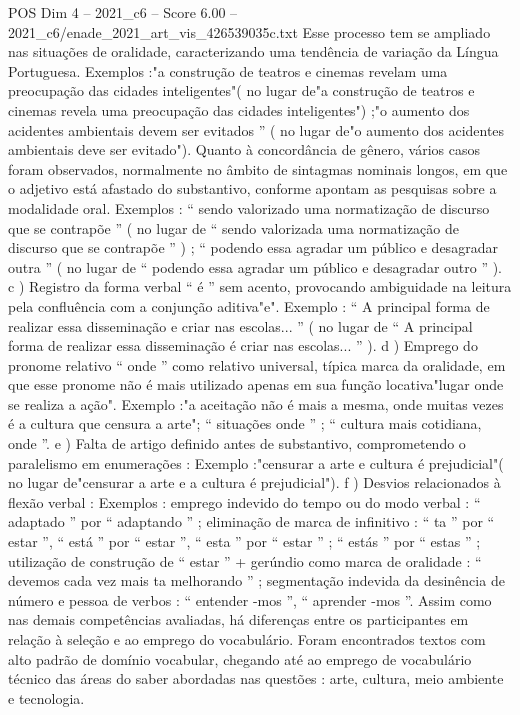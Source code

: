 \begin{textsample}{POS Dim 4 – 2021\_c6 – Score 6.00 – 2021\_c6/enade\_2021\_art\_vis\_426539035c.txt}
Esse processo tem se ampliado nas situações de oralidade, caracterizando uma tendência de variação da Língua Portuguesa.
Exemplos :"a construção de teatros e cinemas revelam uma preocupação das cidades inteligentes"( no lugar de"a construção de teatros e cinemas revela uma preocupação das cidades inteligentes") ;"o aumento dos acidentes ambientais devem ser evitados ” ( no lugar de"o aumento dos acidentes ambientais deve ser evitado").
Quanto à concordância de gênero, vários casos foram observados, normalmente no âmbito de sintagmas nominais longos, em que o adjetivo está afastado do substantivo, conforme apontam as pesquisas sobre a modalidade oral.
Exemplos : “ sendo valorizado uma normatização de discurso que se contrapõe ” ( no lugar de “ sendo valorizada uma normatização de discurso que se contrapõe ” ) ; “ podendo essa agradar um público e desagradar outra ” ( no lugar de “ podendo essa agradar um público e desagradar outro ” ). c ) Registro da forma verbal “ é ” sem acento, provocando ambiguidade na leitura pela confluência com a conjunção aditiva"e".
Exemplo : “ A principal forma de realizar essa disseminação e criar nas escolas... ” ( no lugar de “ A principal forma de realizar essa disseminação é criar nas escolas... ” ). d ) Emprego do pronome relativo “ onde ” como relativo universal, típica marca da oralidade, em que esse pronome não é mais utilizado apenas em sua função locativa"lugar onde se realiza a ação".
Exemplo :"a aceitação não é mais a mesma, onde muitas vezes é a cultura que censura a arte"; “ situações onde ” ; “ cultura mais cotidiana, onde ”. e ) Falta de artigo definido antes de substantivo, comprometendo o paralelismo em enumerações : Exemplo :"censurar a arte e cultura é prejudicial"( no lugar de"censurar a arte e a cultura é prejudicial"). f ) Desvios relacionados à flexão verbal : Exemplos : emprego indevido do tempo ou do modo verbal : “ adaptado ” por “ adaptando ” ; eliminação de marca de infinitivo : “ ta ” por “ estar ”, “ está ” por “ estar ”, “ esta ” por “ estar ” ; “ estás ” por “ estas ” ; utilização de construção de “ estar ” + gerúndio como marca de oralidade : “ devemos cada vez mais ta melhorando ” ; segmentação indevida da desinência de número e pessoa de verbos : “ entender -mos ”, “ aprender -mos ”.
Assim como nas demais competências avaliadas, há diferenças entre os participantes em relação à seleção e ao emprego do vocabulário.
Foram encontrados textos com alto padrão de domínio vocabular, chegando até ao emprego de vocabulário técnico das áreas do saber abordadas nas questões : arte, cultura, meio ambiente e tecnologia.

\end{textsample}
